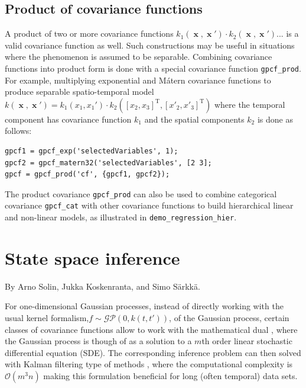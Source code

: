 \documentclass[twoside,11pt]{article}
\DeclareMathOperator{\x}{\mathbf{x}}
\newcommand{\code}[1]{{\normalfont\texttt{#1}}}
\begin{document}
\subsection{Product of covariance functions}

A product of two or more covariance functions $k_1(\x,\x') \cdot
k_2(\x,\x')...$ is a valid covariance function as well. Such
constructions may be useful in situations where the phenomenon is
assumed to be separable. Combining covariance functions into product
form is done with a special covariance function \code{gpcf\_prod}. For
example, multiplying exponential and Mátern covariance functions to
produce separable spatio-temporal model $k(\x,\x') = k_1(x_1,x_1')
\cdot k_2([x_2,x_3]^{\text{T}},[x'_2,x'_3]^{\text{T}})$ where the
temporal component has covariance function $k_1$ and the spatial
components $k_2$ is done as follows:
%
\begin{verbatim}
gpcf1 = gpcf_exp('selectedVariables', 1);
gpcf2 = gpcf_matern32('selectedVariables', [2 3];
gpcf = gpcf_prod('cf', {gpcf1, gpcf2});
\end{verbatim}

The product covariance \code{gpcf\_prod} can also be used to combine
categorical covariance \code{gpcf\_cat} with other covariance
functions to build hierarchical linear and non-linear models, as
illustrated in \code{demo\_regression\_hier}.


\section{State space inference}\label{sec:kalman}
%
{\footnotesize By {Arno Solin}, {Jukka Koskenranta}, and {Simo S{\"a}rkk{\"a}}.\\}

\noindent
For one-dimensional Gaussian processes, instead of directly working with the
usual kernel formalism,$f \sim \mathcal{GP}(0,k(t,t'))$, of the Gaussian
process, certain classes of covariance functions allow to work with the
mathematical dual \citep{Sarkka+Solin+Hartikainen:2013}, where the Gaussian
process is though of as a solution to a $m$th order linear stochastic
differential equation (SDE). The corresponding inference problem can then solved
with Kalman filtering type of methods \citep{Grewal+Andrews:2001,Sarkka:2013},
where the computational complexity is $\mathcal{O}(m^3n)$ making this
formulation beneficial for long (often temporal) data sets.
\end{document}
